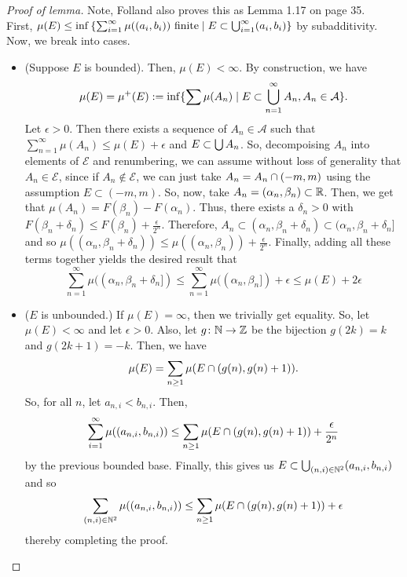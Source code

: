 \documentclass[11pt,leqno,oneside]{amsbook}
\numberwithin{thm}{section}
\renewcommand{\A}{\mathcal{A}} %
\newcommand{\Ep}{\mathcal{E}} %
\begin{document}
\begin{proof}[Proof of lemma]
  Note, Folland also proves this as Lemma 1.17 on page 35.\\
  First, $\mu(E) \leq \inf \left\{ \sum_{i=1}^\infty \mu((a_i,b_i)) \text{
        finite} \mid E
      \subset \bigcup_{i=1}^\infty (a_i,b_i) \right\}$ by
    subadditivity. Now, we break into cases.
    \begin{itemize}
    \item (Suppose $E$ is bounded). Then, $\mu(E) < \infty$. By
      construction, we have \[
        \mu(E) = \mu^+(E) := \inf\{ \sum \mu(A_n) \st E \subset
        \Union_{n=1}^\infty A_n, A_n \in \A\}.
      \]
      Let $\epsilon > 0$. Then there exists a sequence of $A_n \in \A$ such that
      $\sum_{n=1}^\infty \mu(A_n) \leq \mu(E) + \epsilon$ and \(E
      \subset \bigcup A_n\). So,
      decompoising $A_n$ into elements of $\Ep$ and renumbering, we
      can assume without loss of generality that $A_n \in \Ep$, since
      if $A_n \not \in \Ep$, we can just take $A_n = A_n \cap
      (-m,m)$ using the assumption $E \subset (-m,m)$. So, now, take $A_n = (\alpha_n,
      \beta_n) \subset {\mathbb R}$. Then, we get that $\mu(A_n) = F(\beta_n) -
      F(\alpha_n)$. Thus, there exists a $\delta_n > 0$ with
      $F(\beta_n + \delta_n) \leq F(\beta_n) +
      \frac{\epsilon}{2^n}$. Therefore, $A_n \subset
      (\alpha_n, \beta_n + \delta_n) \subset (\alpha_n, \beta_n +
      \delta_n]$ and so $\mu((\alpha_n,\beta_n+\delta_n)) \leq
      \mu((\alpha_n,\beta_n)) + \frac{\epsilon}{2^n}$. Finally, adding
      all these terms together
      yields the desired result that \[
        \sum_{n=1}^\infty \mu((\alpha_n,\beta_n+\delta_n]) \leq
        \sum_{n=1}^\infty \mu((\alpha_n,\beta_n]) + \epsilon \leq
        \mu(E) + 2 \epsilon
      \]
    \item ($E$ is unbounded.) If $\mu(E) = \infty$, then we trivially
      get equality. So, let $\mu(E) < \infty$ and let $\epsilon >
      0$. Also, let $g \colon {\mathbb N} \to {\mathbb Z}$ be the bijection $g(2k) = k$
      and $g(2k+1) = -k$. Then, we have \[
        \mu(E) = \sum_{n \geq 1} \mu(E \cap (g(n),g(n)+1)).
      \]
      So, for all $n$, let $a_{n,i} < b_{n,i}$. Then, \[
        \sum_{i=1}^\infty \mu((a_{n,i},b_{n,i})) \leq \sum_{n \geq 1}
        \mu(E \cap (g(n),g(n)+1)) + \frac{\epsilon}{2^n}
      \]
      by the previous bounded base. Finally, this gives us $E \subset
      \bigcup_{(n,i) \in {\mathbb N}^2} (a_{n,i},b_{n,i})$ and so \[
        \sum_{(n,i) \in {\mathbb N}^2} \mu((a_{n,i},b_{n,i})) \leq \sum_{n \geq
        1} \mu(E
        \cap (g(n),g(n)+1)) + \epsilon
      \]
      thereby completing the proof.
    \end{itemize}
  \end{proof}
\end{document}
